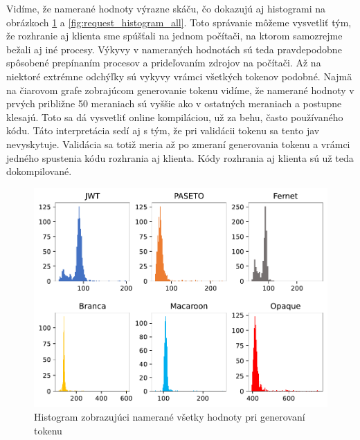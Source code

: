 Vidíme, že namerané hodnoty výrazne skáču, čo dokazujú aj histogrami na obrázkoch \ref{fig:signin_histogram_all} a \ref{fig:request_histogram_all}. Toto správanie môžeme vysvetliť tým, že rozhranie aj klienta sme spúšťali na jednom počítači, na ktorom samozrejme bežali aj iné procesy. Výkyvy v nameraných hodnotách sú teda pravdepodobne spôsobené prepínaním procesov a prideľovaním zdrojov na počítači. Až na niektoré extrémne odchýľky sú vykyvy vrámci všetkých tokenov podobné. Najmä na čiarovom grafe zobrajúcom generovanie tokenu vidíme, že namerané hodnoty v prvých približne 50 meraniach sú vyššie ako v ostatných meraniach a postupne klesajú. Toto sa dá vysvetliť online kompiláciou, už za behu, často používaného kódu. Táto interpretácia sedí aj s tým, že pri validácii tokenu sa tento jav nevyskytuje. Validácia sa totiž meria až po zmeraní generovania tokenu a vrámci jedného spustenia kódu rozhrania aj klienta. Kódy rozhrania aj klienta sú už teda dokompilované.

\begin{figure}
  \centerline{\includegraphics[width=1\textwidth]{images/signin_histogram_all}}
  \caption[Histogram -- generovanie, všetky hodnoty]{Histogram zobrazujúci namerané všetky hodnoty pri generovaní tokenu}
  \label{fig:signin_histogram_all}
\end{figure}


